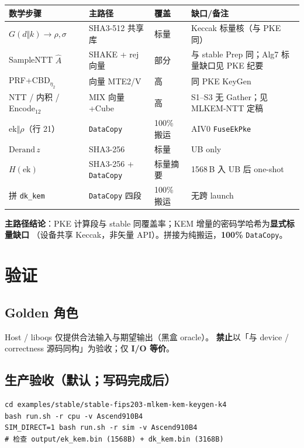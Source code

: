 \documentclass[UTF8,a4paper,11pt]{ctexart}
\begin{document}
\begin{longtable}{@{}L{3.8cm}L{3.6cm}L{1.4cm}L{4.0cm}@{}}
\toprule
数学步骤 & 主路径 & 覆盖 & 缺口/备注 \\
\midrule
$G(d\Vert k)\to\rho,\sigma$ & SHA3-512 共享库 & 标量 & Keccak 标量核（与 PKE 同） \\
SampleNTT $\hat{A}$ & SHAKE + rej 向量 & 部分 & 与 stable Prep 同；Alg7 标量缺口见 PKE 纪要 \\
PRF+CBD$_{\eta_2}$ & 向量 MTE2/V & 高 & 同 PKE KeyGen \\
NTT / 内积 / Encode$_{12}$ & MIX 向量+Cube & 高 & S1--S3 无 Gather；见 MLKEM-NTT 定稿 \\
$\mathrm{ek}\Vert\rho$（行 21） & \texttt{DataCopy} & 100\% 搬运 & AIV0 \texttt{FuseEkPke} \\
$\mathrm{Derand}\,z$ & SHA3-256 & 标量 & UB only \\
$H(\mathrm{ek})$ & SHA3-256 + \texttt{DataCopy} & 标量摘要 & 1568\,B 入 UB 后 one-shot \\
拼 \texttt{dk\_kem} & \texttt{DataCopy} 四段 & 100\% 搬运 & 无跨 launch \\
\bottomrule
\end{longtable}

\textbf{主路径结论}：PKE 计算段与 stable 同覆盖率；KEM 增量的密码学哈希为\textbf{显式标量缺口}
（设备共享 Keccak，非矢量 API）。拼接为纯搬运，\textbf{100\%} \texttt{DataCopy}。

\section{验证}
\label{sec:verify}

\subsection{Golden 角色}

Host / liboqs 仅提供合法输入与期望输出（黑盒 oracle）。
\textbf{禁止}以「与 device / correctness 源码同构」为验收；仅 \textbf{I/O 等价}。

\subsection{生产验收（默认；写码完成后）}

\begin{verbatim}
cd examples/stable/stable-fips203-mlkem-kem-keygen-k4
bash run.sh -r cpu -v Ascend910B4
SIM_DIRECT=1 bash run.sh -r sim -v Ascend910B4
# 检查 output/ek_kem.bin (1568B) + dk_kem.bin (3168B)
\end{verbatim}
\end{document}
